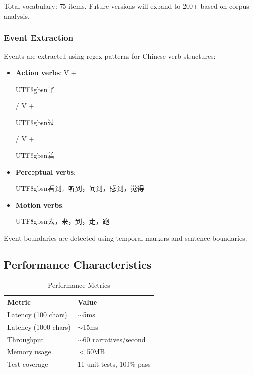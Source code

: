 \documentclass[11pt]{article}
\begin{document}
Total vocabulary: 75 items. Future versions will expand to 200+ based on corpus analysis.

\subsubsection{Event Extraction}

Events are extracted using regex patterns for Chinese verb structures:
\begin{itemize}
    \item \textbf{Action verbs}: V + \begin{CJK}{UTF8}{gbsn}了\end{CJK} / V + \begin{CJK}{UTF8}{gbsn}过\end{CJK} / V + \begin{CJK}{UTF8}{gbsn}着\end{CJK}
    \item \textbf{Perceptual verbs}: \begin{CJK}{UTF8}{gbsn}看到，听到，闻到，感到，觉得\end{CJK}
    \item \textbf{Motion verbs}: \begin{CJK}{UTF8}{gbsn}去，来，到，走，跑\end{CJK}
\end{itemize}

Event boundaries are detected using temporal markers and sentence boundaries.

\subsection{Performance Characteristics}

\begin{table}[h]
\centering
\caption{Performance Metrics}
\label{tab:performance}
\begin{tabular}{ll}
\toprule
\textbf{Metric} & \textbf{Value} \\
\midrule
Latency (100 chars) & $\sim$5ms \\
Latency (1000 chars) & $\sim$15ms \\
Throughput & $\sim$60 narratives/second \\
Memory usage & $<$50MB \\
Test coverage & 11 unit tests, 100\% pass \\
\bottomrule
\end{tabular}
\end{table}
\end{document}

